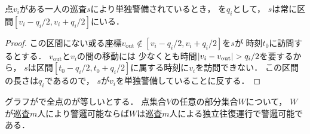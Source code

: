 \begin{lemm}
  \label{lemm:RangeOfPatrollerOnLine}
  点$v_i$がある一人の巡査$s$により単独警備されているとき，
  {\maxIdletime}を$q_i$として，
  $s$は常に区間$[v_i - q_i/2, v_i + q_i/2]$にいる．
\end{lemm}
\begin{proof}
  \newcommand{\vout}{v_{\mathrm{out}}}
  この区間にない或る座標$\vout \notin [v_i - q_i/2, v_i + q_i/2]$を$s$が
  時刻$t_0$に訪問するとする．
  $\vout$と$v_i$の間の移動には
  少なくとも時間$\abs{v_i - \vout} > q_i / 2$を要するから，
  $s$は区間$[t_0 - q_i / 2, t_0 + q_i / 2]$に属する時刻に$v_i$を訪問できない．
  この区間の長さは$q_i$であるので，
  $s$が$v_i$を単独警備していることに反する．
\end{proof}


\begin{lemm}
  \label{lemm:LineUnaryIdletimeIndependentInterval}
  グラフが{\graphLine}で全点の{\maxIdletime}が等しいとする．
  点集合$V$の任意の部分集合$W$について，
  $W$が巡査$m$人により警邏可能ならば$W$は巡査$m$人による独立往復運行で警邏可能である．
\end{lemm}

